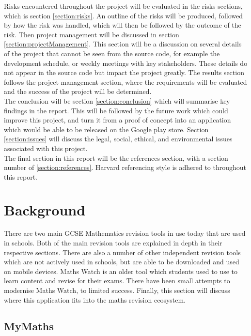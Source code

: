 \documentclass{article}
\begin{document}
Risks encountered throughout the project will be evaluated in the risks sections, which is section \ref{section:risks}. An outline of the risks will be produced, followed by how the risk was handled, which will then be followed by the outcome of the risk. Then project management will be discussed in section \ref{section:projectManagement}. This section will be a discussion on several details of the project that cannot be seen from the source code, for example the development schedule, or weekly meetings with key stakeholders. These details do not appear in the source code but impact the project greatly. The results section follows the project management section, where the requirements will be evaluated and the success of the project will be determined. \\

The conclusion will be section \ref{section:conclusion} which will summarise key findings in the report. This will be followed by the future work which could improve this project, and turn it from a proof of concept into an application which would be able to be released on the Google play store. Section \ref{section:issues} will discuss the legal, social, ethical, and environmental issues associated with this project. \\

The final section in this report will be the references section, with a section number of \ref{section:references}. Harvard referencing style is adhered to throughout this report.\\ 

\section{Background}
\label{section:background}

There are two main GCSE Mathematics revision tools in use today that are used in schools. Both of the main revision tools are explained in depth in their respective sections. There are also a number of other independent revision tools which are not actively used in schools, but are able to be downloaded and used on mobile devices. Maths Watch is an older tool which students used to use to learn content and revise for their exams. There have been small attempts to modernise Maths Watch, to limited success. Finally, this section will discuss where this application fits into the maths revision ecosystem. \\

\subsection{MyMaths}
\end{document}
